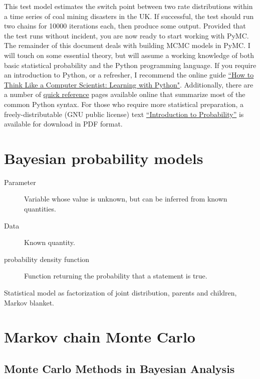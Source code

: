 \documentclass[]{book}
\begin{document}
This test model estimates the switch point between two rate distributions within a time series of coal mining disasters in the UK. If successful, the test should run two chains for 10000 iterations each, then produce some output. Provided that the test runs without incident, you are now ready to start working with PyMC. The remainder of this document deals with building MCMC models in PyMC. I will touch on some essential theory, but will assume a working knowledge of both basic statistical probability and the Python programming language. If you require an introduction to Python, or a refresher, I recommend the online guide \href{http://www.ibiblio.org/obp/thinkCSpy/index.htm}{``How to Think Like a Computer Scientist: Learning with Python"}. Additionally, there are a number of \href{http://rgruet.free.fr/PQR24/PQR2.4.html}{quick reference} pages available online that summarize most of the common Python syntax. For those who require more statistical preparation, a freely-distributable (GNU public license) text \href{https://www.dartmouth.edu/~chance/teaching_aids/books_articles/probability_book/amsbook.mac.pdf}{``Introduction to Probability''} is available for download in PDF format.


\chapter{Bayesian probability models} %
\begin{description}
\item[Parameter] Variable whose value is unknown, but can be inferred from known quantities.
\item[Data] Known quantity.
\item[probability density function] Function returning the probability that a statement is true.
\end{description}

Statistical model as factorization of joint distribution, parents and children, Markov blanket.

\chapter{Markov chain Monte Carlo} %
\label{chap:MCMC} 


\section{Monte Carlo Methods in Bayesian Analysis}
\end{document}

